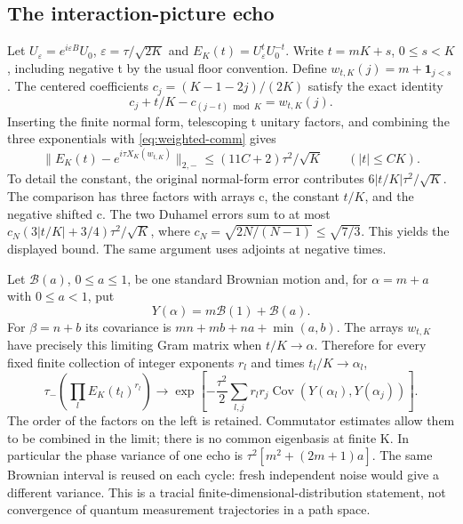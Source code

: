 \subsection{The interaction-picture echo}
Let $U_\varepsilon=e^{i\varepsilon B}U_0$,
$\varepsilon=\tau/\sqrt{2K}$ and $E_K(t)=U_\varepsilon^tU_0^{-t}$.
Write $t=mK+s$, $0\leq s<K$, including negative t by the usual floor
convention. Define $w_{t,K}(j)=m+\mathbf1_{j<s}$.
The centered coefficients $c_j=(K-1-2j)/(2K)$ satisfy the exact identity
\[
 c_j+t/K-c_{(j-t)\bmod K}=w_{t,K}(j).
\]
Inserting the finite normal form, telescoping t unitary factors, and combining
the three exponentials with \eqref{eq:weighted-comm} gives
\begin{equation}\label{eq:echo-finite}
 \|E_K(t)-e^{i\tau X_K(w_{t,K})}\|_{2,-}
       \leq (11C+2)\tau^2/\sqrt K\qquad(|t|\leq CK).
\end{equation}
To detail the constant, the original normal-form error contributes
$6|t/K|\tau^2/\sqrt K$. The comparison has three factors with arrays c,
the constant $t/K$, and the negative shifted c. The two Duhamel errors sum
to at most $c_N(3|t/K|+3/4)\tau^2/\sqrt K$, where
$c_N=\sqrt{2N/(N-1)}\leq\sqrt{7/3}$. This yields the displayed bound.
The same argument uses adjoints at negative times.

Let $\mathcal B(a)$, $0\leq a\leq1$, be one standard Brownian motion and,
for $\alpha=m+a$ with $0\leq a<1$, put
\[
 Y(\alpha)=m\mathcal B(1)+\mathcal B(a).
\]
For $\beta=n+b$ its covariance is
$mn+mb+na+\min(a,b)$. The arrays $w_{t,K}$ have precisely this limiting
Gram matrix when $t/K\to\alpha$. Therefore for every fixed finite collection
of integer exponents $r_l$ and times $t_l/K\to\alpha_l$,
\[
 \tau_-\left(\prod_l E_K(t_l)^{r_l}\right)
 \longrightarrow
 \exp\left[-\frac{\tau^2}{2}\sum_{l,j}r_lr_j
                     \operatorname{Cov}(Y(\alpha_l),Y(\alpha_j))\right].
\]
The order of the factors on the left is retained. Commutator estimates allow
them to be combined in the limit; there is no common eigenbasis at finite K.
In particular the phase variance of one echo is
$\tau^2[m^2+(2m+1)a]$. The same Brownian interval is reused on each cycle:
fresh independent noise would give a different variance. This is a tracial
finite-dimensional-distribution statement, not convergence of quantum
measurement trajectories in a path space.

